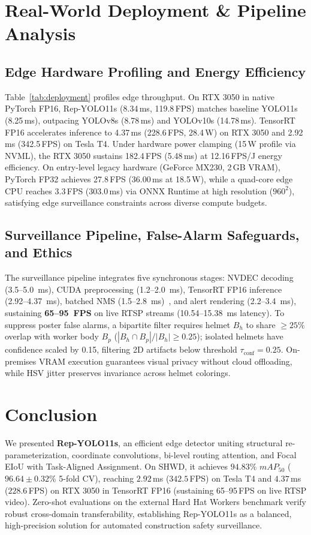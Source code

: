 \documentclass[conference]{IEEEtran}
\begin{document}
\section{Real-World Deployment \& Pipeline Analysis}
\label{sec:deployment}

\subsection{Edge Hardware Profiling and Energy Efficiency}
\label{subsec:profiling}
Table~\ref{tab:deployment} profiles edge throughput. On RTX 3050 in native PyTorch FP16, Rep-YOLO11s (8.34\,ms, 119.8\,FPS) matches baseline YOLO11s (8.25\,ms), outpacing YOLOv8s (8.78\,ms) and YOLOv10s (14.78\,ms). TensorRT FP16 accelerates inference to 4.37\,ms (228.6\,FPS, 28.4\,W) on RTX 3050 and 2.92\,ms (342.5\,FPS) on Tesla T4. Under hardware power clamping (15\,W profile via NVML), the RTX 3050 sustains 182.4\,FPS (5.48\,ms) at 12.16\,FPS/J energy efficiency. On entry-level legacy hardware (GeForce MX230, 2\,GB VRAM), PyTorch FP32 achieves 27.8\,FPS (36.00\,ms at 18.5\,W), while a quad-core edge CPU reaches 3.3\,FPS (303.0\,ms) via ONNX Runtime at high resolution ($960^2$), satisfying edge surveillance constraints across diverse compute budgets.

\subsection{Surveillance Pipeline, False-Alarm Safeguards, and Ethics}
\label{subsec:pipeline}
The surveillance pipeline integrates five synchronous stages: NVDEC decoding (3.5--5.0~ms), CUDA preprocessing (1.2--2.0~ms), TensorRT FP16 inference (2.92--4.37~ms), batched NMS (1.5--2.8~ms)~\cite{bodla2017soft}, and alert rendering (2.2--3.4~ms), sustaining \textbf{65--95~FPS} on live RTSP streams (10.54--15.38~ms latency). To suppress poster false alarms, a bipartite filter requires helmet $B_h$ to share $\ge 25\%$ overlap with worker body $B_p$ ($|B_h \cap B_p| / |B_h| \ge 0.25$); isolated helmets have confidence scaled by 0.15, filtering 2D artifacts below threshold $\tau_{\text{conf}}=0.25$. On-premises VRAM execution guarantees visual privacy without cloud offloading, while HSV jitter preserves invariance across helmet colorings.

\section{Conclusion}
\label{sec:conclusion}
We presented \textbf{Rep-YOLO11s}, an efficient edge detector uniting structural re-parameterization, coordinate convolutions, bi-level routing attention, and Focal EIoU with Task-Aligned Assignment. On SHWD, it achieves $94.83\%$ $mAP_{50}$ ($96.64 \pm 0.32\%$ 5-fold CV), reaching $2.92$\,ms ($342.5$\,FPS) on Tesla T4 and $4.37$\,ms ($228.6$\,FPS) on RTX 3050 in TensorRT FP16 (sustaining 65--95\,FPS on live RTSP video). Zero-shot evaluations on the external Hard Hat Workers benchmark verify robust cross-domain transferability, establishing Rep-YOLO11s as a balanced, high-precision solution for automated construction safety surveillance.
\end{document}
